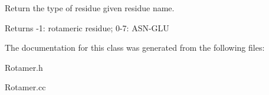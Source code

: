 Return the type of residue given residue name. 

\begin{DoxyReturn}{Returns}
-\/1\-: rotameric residue; 0-\/7\-: A\-S\-N-\/\-G\-L\-U 
\end{DoxyReturn}


The documentation for this class was generated from the following files\-:\begin{DoxyCompactItemize}
\item 
Rotamer.\-h\item 
Rotamer.\-cc\end{DoxyCompactItemize}
